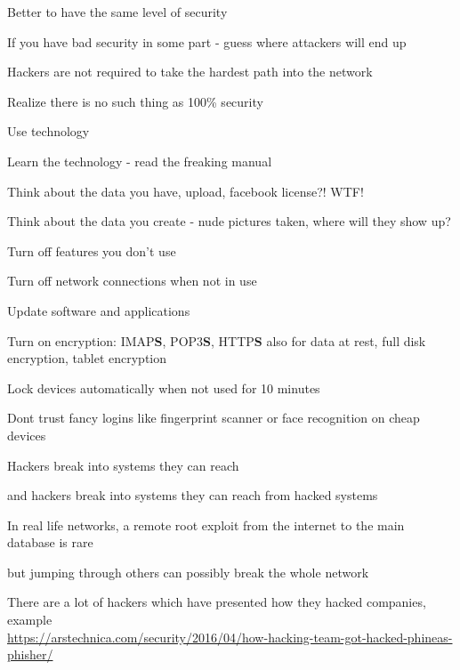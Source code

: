 \documentclass[20pt,landscape,a4paper,footrule]{foils}
\begin{document}


\begin{list1}
\item Better to have the same level of security
\item If you have bad security in some part - guess where attackers will end up
\item Hackers are not required to take the hardest path into the network
\item Realize there is no such thing as 100\% security
\end{list1}



\begin{list1}
\item Use technology
\item Learn the technology - read the freaking manual
\item Think about the data you have, upload, facebook license?! WTF!
\item Think about the data you create - nude pictures taken, where will they show up?
\begin{list2}
\item Turn off features you don't use
\item Turn off network connections when not in use
\item Update software and applications
\item Turn on encryption: IMAP{\bf S}, POP3{\bf S},
  HTTP{\bf S} also for data at rest, full disk encryption, tablet encryption
\item Lock devices automatically when not used for 10 minutes
\item Dont trust fancy logins like fingerprint scanner or face recognition on cheap devices
\end{list2}
\end{list1}




\begin{list1}
\item Hackers break into systems they can reach
\item and hackers break into systems they can reach from hacked systems \smiley
\item In real life networks, a remote root exploit from the internet to the main database is rare
\item but jumping through others can possibly break the whole network
\item There are a lot of hackers which have presented how they hacked companies, example\\
{\tiny\url{https://arstechnica.com/security/2016/04/how-hacking-team-got-hacked-phineas-phisher/}}
\end{list1}
\end{document}
